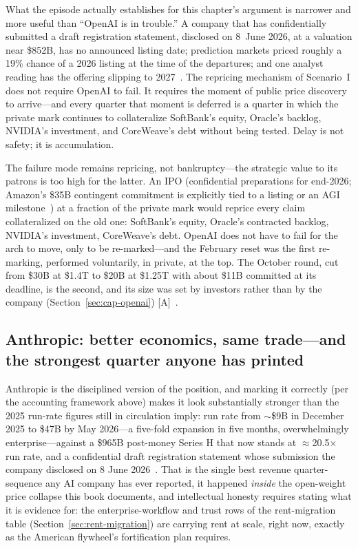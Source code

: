 What the episode actually establishes for this chapter's argument is narrower and more useful than ``OpenAI is in trouble.'' A company that has confidentially submitted a draft registration statement, disclosed on 8~June 2026, at a valuation near \$852B, has no announced listing date; prediction markets priced roughly a 19\% chance of a 2026 listing at the time of the departures; and one analyst reading has the offering slipping to 2027~\cite{openai-s1,openai-exits}. The repricing mechanism of Scenario~I does not require OpenAI to fail. It requires the moment of public price discovery to arrive---and every quarter that moment is deferred is a quarter in which the private mark continues to collateralize SoftBank's equity, Oracle's backlog, NVIDIA's investment, and CoreWeave's debt without being tested. Delay is not safety; it is accumulation.

The failure mode remains repricing, not bankruptcy---the strategic value to its patrons is too high for the latter. An IPO (confidential preparations for end-2026; Amazon's \$35B contingent commitment is explicitly tied to a listing or an AGI milestone~\cite{openai-ipo}) at a fraction of the private mark would reprice every claim collateralized on the old one: SoftBank's equity, Oracle's contracted backlog, NVIDIA's investment, CoreWeave's debt. OpenAI does not have to fail for the arch to move, only to be re-marked---and the February reset was the first re-marking, performed voluntarily, in private, at the top. The October round, cut from \$30B at \$1.4T to \$20B at \$1.25T with about \$11B committed at its deadline, is the second, and its size was set by investors rather than by the company (Section~\ref{sec:cap-openai}) [A]~\cite{cap-openai-round}.

\subsection{Anthropic: better economics, same trade---and the strongest quarter anyone has printed}

Anthropic is the disciplined version of the position, and marking it correctly (per the accounting framework above) makes it look substantially stronger than the 2025 run-rate figures still in circulation imply: run rate from $\sim$\$9B in December 2025 to \$47B by May 2026---a five-fold expansion in five months, overwhelmingly enterprise---against a \$965B post-money Series H that now stands at $\approx$20.5$\times$ run rate, and a confidential draft registration statement whose submission the company disclosed on 8 June 2026~\cite{anthropic-series-h,anthropic-econ,openai-s1}. That is the single best revenue quarter-sequence any AI company has ever reported, it happened \emph{inside} the open-weight price collapse this book documents, and intellectual honesty requires stating what it is evidence for: the enterprise-workflow and trust rows of the rent-migration table (Section~\ref{sec:rent-migration}) are carrying rent at scale, right now, exactly as the American flywheel's fortification plan requires.

